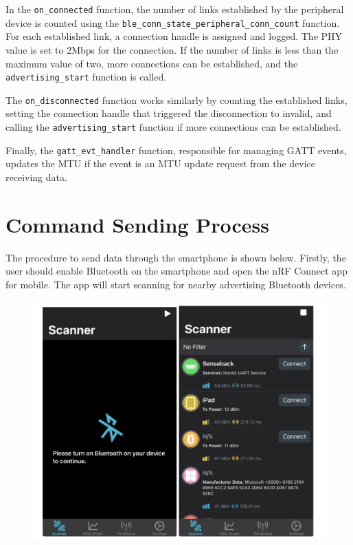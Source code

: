 \documentclass{Configuration_Files/PoliMi3i_thesis}
\begin{document}
In the \texttt{on\_connected} function, the number of links established by the peripheral device is counted using the \texttt{ble\_conn\_state\_peripheral\_conn\_count} function. For each established link, a connection handle is assigned and logged. The PHY value is set to 2Mbps for the connection. If the number of links is less than the maximum value of two, more connections can be established, and the \texttt{advertising\_start} function is called.

The \texttt{on\_disconnected} function works similarly by counting the established links, setting the connection handle that triggered the disconnection to invalid, and calling the \texttt{advertising\_start} function if more connections can be established.

Finally, the \texttt{gatt\_evt\_handler} function, responsible for managing GATT events, updates the MTU if the event is an MTU update request from the device receiving data.

\section{Command Sending Process}
The procedure to send data through the smartphone is shown below. Firstly, the user should enable Bluetooth on the smartphone and open the nRF Connect app for mobile. The app will start scanning for nearby advertising Bluetooth devices.

\begin{figure}[H]
    \centering
    \includegraphics[scale=0.3]{Multicentral/6.png}
    \label{fig:nrf_connect_scanning}
\end{figure}
\end{document}

